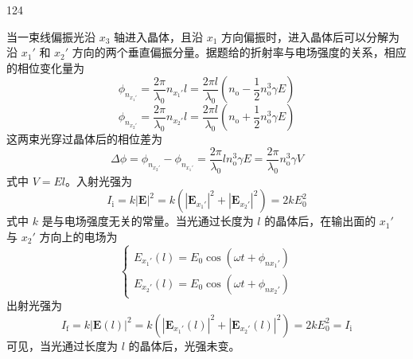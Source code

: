 \begin{solution}{124}
    \begin{subsolution}
        当一束线偏振光沿 $x_{3}$ 轴进入晶体，且沿 $x_{1}$ 方向偏振时，进入晶体后可以分解为沿 $x_{1}'$ 和 $x_{2}'$ 方向的两个垂直偏振分量。据题给的折射率与电场强度的关系，相应的相位变化量为
        \begin{equation}
            \phi_{n_{x_{1}'}} = \frac{2 \pi}{\lambda_{0}} n_{x_{1}'} l = \frac{2 \pi l}{\lambda_{0}} (n_{\mathrm{o}} - \frac{1}{2} n_{\mathrm{o}}^{3} \gamma E)
            \label{eq:1.s124}
        \end{equation}
        \begin{equation}
            \phi_{n_{x_{2}'}} = \frac{2 \pi}{\lambda_{0}} n_{x_{2}'} l = \frac{2 \pi l}{\lambda_{0}} (n_{\mathrm{o}} + \frac{1}{2} n_{\mathrm{o}}^{3} \gamma E)
            \label{eq:2.s124}
        \end{equation}
        这两束光穿过晶体后的相位差为
        \begin{equation}
            \Delta \phi = \phi_{n_{x_{2}'}} - \phi_{n_{x_{1}'}} = \frac{2 \pi}{\lambda_{0}} l n_{\mathrm{o}}^{3} \gamma E = \frac{2 \pi}{\lambda_{0}} n_{\mathrm{o}}^{3} \gamma V
            \label{eq:3.s124}
        \end{equation}
        式中 $V = E l$。入射光强为
        \begin{equation}
            I_{\mathrm{i}} = k |\mathbf{E}|^{2} = k (|\mathbf{E}_{x_{1}'}|^{2} + |\mathbf{E}_{x_{2}'}|^{2}) = 2 k E_{0}^{2}
            \label{eq:4.s124}
        \end{equation}
        式中 $k$ 是与电场强度无关的常量。当光通过长度为 $l$ 的晶体后，在输出面的 $x_{1}'$ 与 $x_{2}'$ 方向上的电场为
        \begin{equation}
            \left\{ \begin{array}{l} E_{x_{1}'}(l) = E_{0} \cos (\omega t + \phi_{n x_{1}'}) \\ E_{x_{2}'}(l) = E_{0} \cos (\omega t + \phi_{n x_{2}'}) \end{array} \right.
            \label{eq:5.s124}
        \end{equation}
        出射光强为
        \begin{equation}
            I_{\mathrm{f}} = k |\mathbf{E}(l)|^{2} = k (|\mathbf{E}_{x_{1}'}(l)|^{2} + |\mathbf{E}_{x_{2}'}(l)|^{2}) = 2 k E_{0}^{2} = I_{\mathrm{i}}
            \label{eq:6.s124}
        \end{equation}
        可见，当光通过长度为 $l$ 的晶体后，光强未变。


\end{subsolution}
\end{solution}
